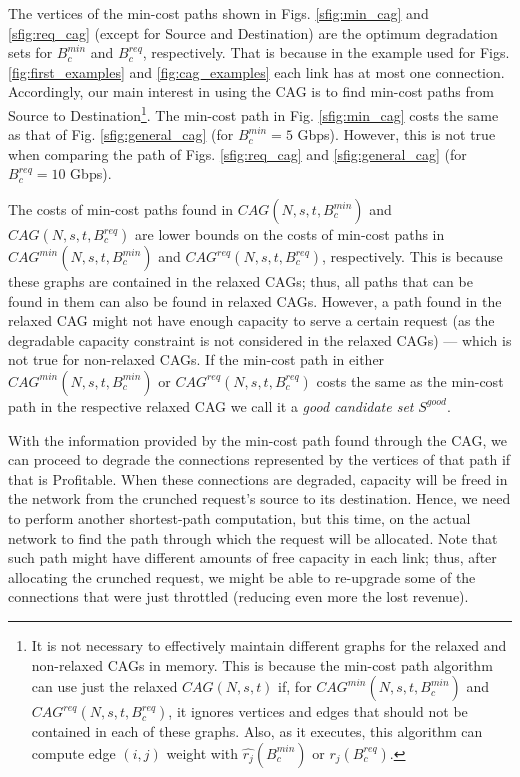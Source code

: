 \documentclass[journal]{IEEEtran}
\begin{document}
The vertices of the min-cost paths shown in Figs. \ref{sfig:min_cag} and \ref{sfig:req_cag} (except for Source and Destination) are the optimum degradation sets for $B^{min}_{c}$ and $B^{req}_{c}$, respectively. That is because in the example used for Figs. \ref{fig:first_examples} and \ref{fig:cag_examples} each link has at most one connection. Accordingly, our main interest in using the CAG is to find min-cost paths from Source to Destination\footnote{It is not necessary to effectively maintain different graphs for the relaxed and non-relaxed CAGs in memory. This is because the min-cost path algorithm can use just the relaxed $CAG(N, s, t)$ if, for $CAG^{min}(N, s, t, B^{min}_{c})$ and $CAG^{req}(N, s, t, B^{req}_{c})$, it ignores vertices and edges that should not be contained in each of these graphs. Also, as it executes, this algorithm can compute edge $(i,j)$ weight with $\widehat{r_j}(B^{min}_{c})$ or $\widehat{r_j}(B^{req}_{c})$.}. The min-cost path in Fig. \ref{sfig:min_cag} costs the same as that of Fig. \ref{sfig:general_cag} (for $B^{min}_{c} = 5$ Gbps). However, this is not true when comparing the path of Figs. \ref{sfig:req_cag} and \ref{sfig:general_cag} (for $B^{req}_{c} = 10$ Gbps). 

The costs of min-cost paths found in $CAG(N, s, t, B^{min}_{c})$ and $CAG(N, s, t, B^{req}_{c})$ are lower bounds on the costs of min-cost paths in $CAG^{min}(N, s, t, B^{min}_{c})$ and $CAG^{req}(N, s, t, B^{req}_{c})$, respectively. This is because these graphs are contained in the relaxed CAGs; thus, all paths that can be found in them can also be found in relaxed CAGs. However, a path found in the relaxed CAG might not have enough capacity to serve a certain request (as the degradable capacity constraint is not considered in the relaxed CAGs) --- which is not true for non-relaxed CAGs. If the min-cost path in either $CAG^{min}(N, s, t, B^{min}_{c})$ or $CAG^{req}(N, s, t, B^{req}_{c})$ costs the same as the min-cost path in the respective relaxed CAG we call it a \textit{good candidate set} $S^{good}$. 

With the information provided by the min-cost path found through the CAG, we can proceed to degrade the connections represented by the vertices of that path if that is Profitable. When these connections are degraded, capacity will be freed in the network from the crunched request's source to its destination. Hence, we need to perform another shortest-path computation, but this time, on the actual network to find the path through which the request will be allocated. Note that such path might have different amounts of free capacity in each link; thus, after allocating the crunched request, we might be able to re-upgrade some of the connections that were just throttled (reducing even more the lost revenue).
\end{document}
